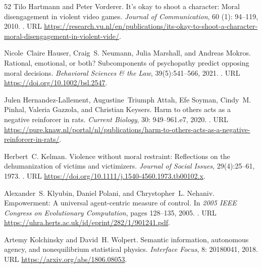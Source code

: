 \documentclass[11pt,a4paper]{article}
\theoremstyle{remark}
\begin{document}
\begin{thebibliography}{52}
Tilo Hartmann and Peter Vorderer.
\newblock It's okay to shoot a character: Moral disengagement in violent video
  games.
\newblock \emph{Journal of Communication}, 60 (1): 94--119,
  2010.
\newblock {}.
\newblock URL
  \url{https://research.vu.nl/en/publications/its-okay-to-shoot-a-character-moral-disengagement-in-violent-vide/}.

Nicole~Claire Hauser, Craig~S. Neumann, Julia Marshall, and Andreas Mokros.
\newblock Rational, emotional, or both? Subcomponents of psychopathy predict opposing moral decisions.
\newblock \emph{Behavioral Sciences \& the Law}, 39(5):541--566, 2021.
\newblock {}.
\newblock URL \url{https://doi.org/10.1002/bsl.2547}.

Julen Hernandez-Lallement, Augustine~Triumph Attah, Efe Soyman, Cindy~M.
  Pinhal, Valeria Gazzola, and Christian Keysers.
\newblock Harm to others acts as a negative reinforcer in rats.
\newblock \emph{Current Biology}, 30: 949--961.e7, 2020.
\newblock {}.
\newblock URL
  \url{https://pure.knaw.nl/portal/nl/publications/harm-to-others-acts-as-a-negative-reinforcer-in-rats/}.

Herbert~C. Kelman.
\newblock Violence without moral restraint: Reflections on the dehumanization
of victims and victimizers.
\newblock \emph{Journal of Social Issues}, 29(4):25--61, 1973.
\newblock {}.
\newblock URL \url{https://doi.org/10.1111/j.1540-4560.1973.tb00102.x}.

Alexander~S. Klyubin, Daniel Polani, and Chrystopher~L. Nehaniv.
\newblock Empowerment: A universal agent-centric measure of control.
\newblock In \emph{2005 IEEE Congress on Evolutionary Computation}, pages
  128--135, 2005.
\newblock {}.
\newblock URL \url{https://uhra.herts.ac.uk/id/eprint/282/1/901241.pdf}.

Artemy Kolchinsky and David~H. Wolpert.
\newblock Semantic information, autonomous agency, and nonequilibrium
  statistical physics.
\newblock \emph{Interface Focus}, 8: 20180041, 2018.
\newblock URL \url{https://arxiv.org/abs/1806.08053}.


\end{thebibliography}
\end{document}
